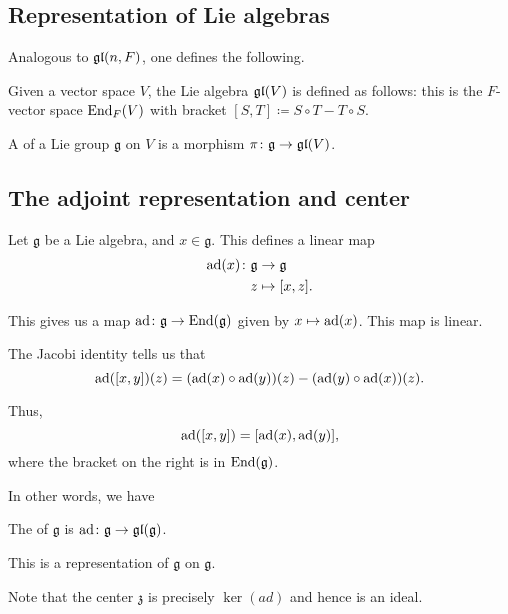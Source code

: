 \documentclass[12pt]{article}
\begin{document}
\subsection{Representation of Lie algebras}

Analogous to $\mathfrak{gl}(n, F)$, one defines the following.
\begin{defn}
	Given a vector space $V$, the Lie algebra $\mathfrak{gl}(V)$ is defined as follows: this is the $F$-vector space $\operatorname{End}_{F}(V)$ with bracket $[S, T] \coloneqq S \circ T - T \circ S$.
\end{defn}

\begin{defn}
	A  of a Lie group $\mathfrak{g}$ on $V$ is a morphism $\pi \colon \mathfrak{g} \to \mathfrak{gl}(V)$.
\end{defn}

\subsection{The adjoint representation and center}

Let $\mathfrak{g}$ be a Lie algebra, and $x \in \mathfrak{g}$. 
This defines a linear map 
\begin{align*} 
	\operatorname{ad}(x) \colon \mathfrak{g} & \to \mathfrak{g} \\
	z & \mapsto [x, z].
\end{align*}

This gives us a map $\operatorname{ad} \colon \mathfrak{g} \to \operatorname{End}(\mathfrak{g})$ given by $x \mapsto \operatorname{ad}(x)$. 
This map is linear.

The Jacobi identity tells us that
\begin{equation*} 
	\operatorname{ad}([x, y])(z) = (\operatorname{ad}(x) \circ \operatorname{ad}(y))(z) - (\operatorname{ad}(y) \circ \operatorname{ad}(x))(z).
\end{equation*}

Thus,
\begin{equation*} 
	\operatorname{ad}([x, y]) = [\operatorname{ad}(x), \operatorname{ad}(y)],
\end{equation*}
where the bracket on the right is in $\operatorname{End}(\mathfrak{g})$. 

In other words, we have
\begin{defn}
	The  of $\mathfrak{g}$ is $\operatorname{ad} \colon \mathfrak{g} \to \mathfrak{gl}(\mathfrak{g})$. 
\end{defn}
This is a representation of $\mathfrak{g}$ on $\mathfrak{g}$.

Note that the center $\mathfrak{z}$ is precisely $\ker(ad)$ and hence is an ideal.
\end{document}
